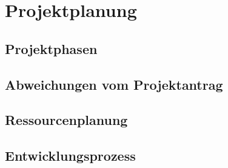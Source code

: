 
\section{Projektplanung}
\blindtext
\subsection{Projektphasen}
\subsection{Abweichungen vom Projektantrag}
\subsection{Ressourcenplanung}
\subsection{Entwicklungsprozess}